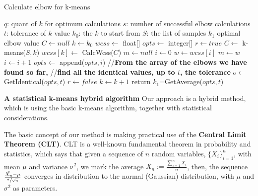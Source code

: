 \documentclass[12pt]{article}
\begin{document}
\begin{algorithm}
\caption{Calculate elbow for k-means}
\begin{algorithmic} 
\REQUIRE
\STATE $q$: quant of $k$ for optimum calculations
\STATE $s$: number of successful elbow calculations
\STATE $t$: tolerance of $k$ value
\STATE $k_0$: the $k$ to start from
\STATE $S$: the list of samples
\ENSURE $k_1$ optimal elbow value
\STATE $C \leftarrow null$
\STATE $k \leftarrow k_0$
\newline
\STATE $wcss \leftarrow $ float[]
\STATE $opts \leftarrow $ integer[]
\STATE $r \leftarrow true$
\newline
{}
\STATE $C \leftarrow $ k-means($S, k$)
\newline
\STATE $wcss[k] \leftarrow $ CalcWcss($C$)
\newline
{}
\STATE $m \leftarrow null$
\STATE $i \leftarrow 0$
\STATE $w \leftarrow wcss[i]$
\newline
{}
\STATE $m \leftarrow w$
\ENDIF
\newline
\STATE $i \leftarrow i+1$
\ENDWHILE
\STATE $opts \leftarrow $ append($opts,i$)
\ENDIF \newline
//\textbf{From the array of the elbows we have found so far,}\newline
//\textbf{find all the identical values, up to $t$, the tolerance}
\STATE $o \leftarrow $ GetIdentical($opts,t$)
\STATE $r \leftarrow false$
\ELSE
\STATE $k \leftarrow k+1$
\ENDIF
\newline
\ENDWHILE
\STATE return $k_1$=GetAverage($opts,t$)
\end{algorithmic}
\end{algorithm}

\newpage
\textbf{\large A statistical k-means hybrid algorithm} \newline
Our approach is a hybrid method, which is using the basic k-means algorithm, together with statistical considerations. \newline

The basic concept of our method is making practical use of the \textbf{Central Limit Theorem (CLT)}. \newline
CLT is a well-known fundamental theorem in probability and statistics, which says that given a sequence of $n$ random variables, \( \{X_i\}_{i=1}^n \), with mean $\mu$ and variance $\sigma^2$, we mark the average 
\( \bar{X_n}:=\frac{\sum_{i=1}^n X_i}{n} \), then,\newline
the sequence \( \frac{\bar{X_n}-\mu}{\sfrac{\sigma}{\sqrt{n}}} \) converges in distribution 
to the normal (Gaussian) distribution, with $\mu$ and $\sigma^2$ as parameters.
\end{document}
